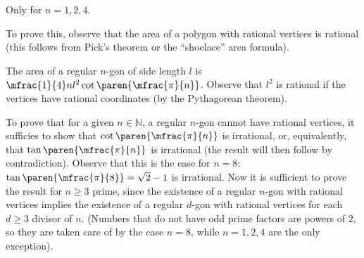 Only for $n = 1, 2, 4$.

To prove this, observe that the area of a polygon with rational vertices is rational
(this follows from Pick's theorem or the ``shoelace'' area formula).

The area of a regular $n$-gon of side length $l$ is $\mfrac{1}{4} n l^2 \cot\paren{\mfrac{\pi}{n}}$.
Observe that $l^2$ is rational if the vertices have rational coordinates (by the Pythagorean theorem).

To prove that for a given $n \in \mathbb{N}$, a regular $n$-gon cannot have rational vertices,
it sufficies to show that $\cot\paren{\mfrac{\pi}{n}}$ is irrational,
or, equivalently, that $\tan\paren{\mfrac{\pi}{n}}$ is irrational
(the result will then follow by contradiction). \newline
Observe that this is the case for $n = 8$:
$\tan\paren{\mfrac{\pi}{8}} = \sqrt{2} - 1$ is irrational.
Now it is sufficient to prove the result for $n \geq 3$ prime,
since the existence of a regular $n$-gon with rational vertices
implies the existence of a regular $d$-gon with rational vertices
for each $d \geq 3$ divisor of $n$.
(Numbers that do not have odd prime factors are powers of $2$,
so they are taken care of by the case $n = 8$,
while $n = 1, 2, 4$ are the only exception).

